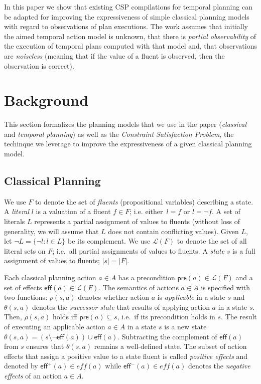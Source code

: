 \documentclass[letterpaper]{article} %
\newcommand{\pre}{\mathsf{pre}}     %
\newcommand{\eff}{\mathsf{eff}}     %
\begin{document}
In this paper we show that existing CSP compilations for temporal planning can be adapted for improving the expressiveness of simple classical planning models with regard to observations of plan executions. The work assumes that initially the aimed temporal action model is unknown, that there is {\em partial observability} of the execution of temporal plans computed with that model and, that observations are {\em noiseless} (meaning that if the value of a fluent is observed, then the observation is correct).



\section{Background}
\label{sec:background}
This section formalizes the planning models that we use in the paper ({\em classical} and {\em temporal planning}) as well as the {\em Constraint Satisfaction Problem}, the techinque we leverage to improve the expressiveness of a given classical planning model.

\subsection{Classical Planning}
We use $F$ to denote the set of {\em fluents} (propositional variables) describing a state. A {\em literal} $l$ is a valuation of a fluent $f\in F$; i.e. either~$l=f$ or $l=\neg f$. A set of literals $L$ represents a partial assignment of values to fluents (without loss of generality, we will assume that $L$ does not contain conflicting values). Given $L$, let $\neg L=\{\neg l:l\in L\}$ be its complement. We use $\mathcal{L}(F)$ to denote the set of all literal sets on $F$; i.e.~all partial assignments of values to fluents. A {\em state} $s$ is a full assignment of values to fluents; $|s|=|F|$.

Each classical planning action $a\in A$ has a precondition $\pre(a)\in\mathcal{L}(F)$ and a set of effects $\eff(a)\in\mathcal{L}(F)$. The semantics of actions $a\in A$ is specified with two functions: $\rho(s,a)$ denotes whether action $a$ is {\em applicable} in a state $s$ and $\theta(s,a)$ denotes the {\em successor state} that results of applying action $a$ in a state $s$. Then, $\rho(s,a)$ holds iff $\pre(a)\subseteq s$, i.e.~if its precondition holds in $s$. The result of executing an applicable action $a\in A$ in a state $s$ is a new state $\theta(s,a)=(s\setminus \neg\eff(a))\cup\eff(a)$. Subtracting the complement of $\eff(a)$ from $s$ ensures that $\theta(s,a)$ remains a well-defined state. The subset of action effects that assign a positive value to a state fluent is called {\em positive effects} and denoted by $\eff^+(a)\in eff(a)$ while $\eff^-(a)\in eff(a)$ denotes the {\em negative effects} of an action $a\in A$.
\end{document}

